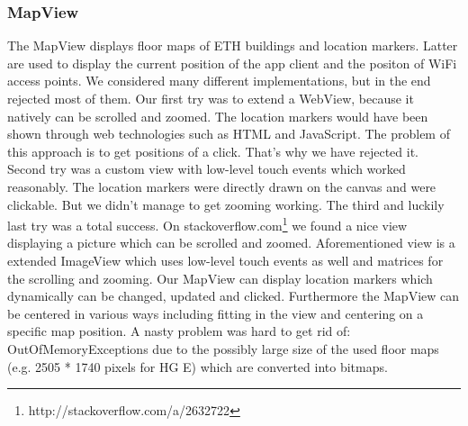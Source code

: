 \subsubsection{MapView}
The MapView displays floor maps of ETH buildings and location markers. Latter are used to display the current position of the app client and the positon of WiFi access points. We considered many different implementations, but in the end rejected most of them. Our first try was to extend a WebView, because it natively can be scrolled and zoomed. The location markers would have been shown through web technologies such as HTML and JavaScript. The problem of this approach is to get positions of a click. That's why we have rejected it. Second try was a custom view with low-level touch events which worked reasonably. The location markers were directly drawn on the canvas and were clickable. But we didn't manage to get zooming working. The third and luckily last try was a total success. On stackoverflow.com\footnote{http://stackoverflow.com/a/2632722} we found a nice view displaying a picture which can be scrolled and zoomed. Aforementioned view is a extended ImageView which uses low-level touch events as well and matrices for the scrolling and zooming. Our MapView can display location markers which dynamically can be changed, updated and clicked. Furthermore the MapView can be centered in various ways including fitting in the view and centering on a specific map position. A nasty problem was hard to get rid of: OutOfMemoryExceptions due to the possibly large size of the used floor maps (e.g. 2505 * 1740 pixels for HG E) which are converted into bitmaps.
